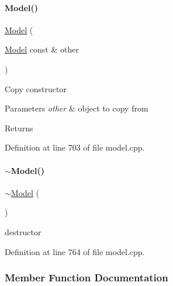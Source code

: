 \paragraph{\texorpdfstring{Model()}{Model()}\hspace{0.1cm}{\footnotesize\ttfamily [3/3]}}
{\footnotesize\ttfamily \mbox{\hyperlink{classamici_1_1_model}{Model}} (\begin{DoxyParamCaption}\item[{\mbox{\hyperlink{classamici_1_1_model}{Model}} const \&}]{other }\end{DoxyParamCaption})}

Copy constructor 
\begin{DoxyParams}{Parameters}
{\em other} & object to copy from \\
\hline
\end{DoxyParams}
\begin{DoxyReturn}{Returns}

\end{DoxyReturn}


Definition at line 703 of file model.\+cpp.

\mbox{\label{classamici_1_1_model_a252c349b237f7779edf32778eb541a99}} 
\paragraph{\texorpdfstring{$\sim$\+Model()}{~Model()}}
{\footnotesize\ttfamily $\sim$\mbox{\hyperlink{classamici_1_1_model}{Model}} (\begin{DoxyParamCaption}{ }\end{DoxyParamCaption})\hspace{0.3cm}{\ttfamily [virtual]}}

destructor 

Definition at line 764 of file model.\+cpp.



\subsubsection{Member Function Documentation}
\mbox{\label{classamici_1_1_model_abcf360cf2836a5c7a7686a6a5c0c6bfa}} 
